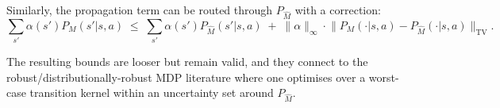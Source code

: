\documentclass[11pt]{article}
\begin{document}
Similarly, the propagation term can be routed through $P_{\hat M}$ with a
correction:
\[
  \sum_{s'} \alpha(s') P_M(s'|s,a)
  \;\le\; \sum_{s'} \alpha(s') P_{\hat M}(s'|s,a)
  \;+\; \|\alpha\|_\infty \cdot
        \bigl\|P_M(\cdot|s,a) - P_{\hat M}(\cdot|s,a)\bigr\|_{\mathrm{TV}}.
\]

The resulting bounds are looser but remain valid, and they connect to the
robust/distributionally-robust MDP literature where one optimises over a
worst-case transition kernel within an uncertainty set around $P_{\hat M}$.

\newpage


\end{document}

